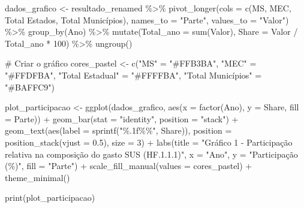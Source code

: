 \documentclass[
  letterpaper,
  DIV=11,
  numbers=noendperiod]{scrartcl}
\newenvironment{Shaded}{\begin{snugshade}}{\end{snugshade}}
\newcommand{\AttributeTok}[1]{\textcolor[rgb]{0.40,0.45,0.13}{#1}}
\newcommand{\CommentTok}[1]{\textcolor[rgb]{0.37,0.37,0.37}{#1}}
\newcommand{\DecValTok}[1]{\textcolor[rgb]{0.68,0.00,0.00}{#1}}
\newcommand{\FloatTok}[1]{\textcolor[rgb]{0.68,0.00,0.00}{#1}}
\newcommand{\FunctionTok}[1]{\textcolor[rgb]{0.28,0.35,0.67}{#1}}
\newcommand{\NormalTok}[1]{\textcolor[rgb]{0.00,0.23,0.31}{#1}}
\newcommand{\OtherTok}[1]{\textcolor[rgb]{0.00,0.23,0.31}{#1}}
\newcommand{\SpecialCharTok}[1]{\textcolor[rgb]{0.37,0.37,0.37}{#1}}
\newcommand{\StringTok}[1]{\textcolor[rgb]{0.13,0.47,0.30}{#1}}
\begin{document}
\begin{Shaded}
\begin{Highlighting}[]
\NormalTok{dados\_grafico }\OtherTok{\textless{}{-}}\NormalTok{ resultado\_renamed }\SpecialCharTok{\%\textgreater{}\%}
  \FunctionTok{pivot\_longer}\NormalTok{(}\AttributeTok{cols =} \FunctionTok{c}\NormalTok{(MS, MEC, }\StringTok{\textasciigrave{}}\AttributeTok{Total Estados}\StringTok{\textasciigrave{}}\NormalTok{, }\StringTok{\textasciigrave{}}\AttributeTok{Total Municípios}\StringTok{\textasciigrave{}}\NormalTok{), }
               \AttributeTok{names\_to =} \StringTok{"Parte"}\NormalTok{, }
               \AttributeTok{values\_to =} \StringTok{"Valor"}\NormalTok{) }\SpecialCharTok{\%\textgreater{}\%}
  \FunctionTok{group\_by}\NormalTok{(Ano) }\SpecialCharTok{\%\textgreater{}\%}
  \FunctionTok{mutate}\NormalTok{(}\AttributeTok{Total\_ano =} \FunctionTok{sum}\NormalTok{(Valor),}
         \AttributeTok{Share =}\NormalTok{ Valor }\SpecialCharTok{/}\NormalTok{ Total\_ano }\SpecialCharTok{*} \DecValTok{100}\NormalTok{) }\SpecialCharTok{\%\textgreater{}\%}
  \FunctionTok{ungroup}\NormalTok{()}

\CommentTok{\# Criar o gráfico}
\NormalTok{cores\_pastel }\OtherTok{\textless{}{-}} \FunctionTok{c}\NormalTok{(}\StringTok{"MS"} \OtherTok{=} \StringTok{"\#FFB3BA"}\NormalTok{, }\StringTok{"MEC"} \OtherTok{=} \StringTok{"\#FFDFBA"}\NormalTok{, }\StringTok{"Total Estadual"} \OtherTok{=} \StringTok{"\#FFFFBA"}\NormalTok{, }\StringTok{"Total Municípios"} \OtherTok{=} \StringTok{"\#BAFFC9"}\NormalTok{)}

\NormalTok{plot\_participacao }\OtherTok{\textless{}{-}} \FunctionTok{ggplot}\NormalTok{(dados\_grafico, }\FunctionTok{aes}\NormalTok{(}\AttributeTok{x =} \FunctionTok{factor}\NormalTok{(Ano), }\AttributeTok{y =}\NormalTok{ Share, }\AttributeTok{fill =}\NormalTok{ Parte)) }\SpecialCharTok{+}
  \FunctionTok{geom\_bar}\NormalTok{(}\AttributeTok{stat =} \StringTok{"identity"}\NormalTok{, }\AttributeTok{position =} \StringTok{"stack"}\NormalTok{) }\SpecialCharTok{+}
  \FunctionTok{geom\_text}\NormalTok{(}\FunctionTok{aes}\NormalTok{(}\AttributeTok{label =} \FunctionTok{sprintf}\NormalTok{(}\StringTok{"\%.1f\%\%"}\NormalTok{, Share)), }
            \AttributeTok{position =} \FunctionTok{position\_stack}\NormalTok{(}\AttributeTok{vjust =} \FloatTok{0.5}\NormalTok{), }\AttributeTok{size =} \DecValTok{3}\NormalTok{) }\SpecialCharTok{+}
  \FunctionTok{labs}\NormalTok{(}\AttributeTok{title =} \StringTok{"Gráfico 1 {-} Participação relativa na composição do gasto SUS (HF.1.1.1)"}\NormalTok{,}
       \AttributeTok{x =} \StringTok{"Ano"}\NormalTok{,}
       \AttributeTok{y =} \StringTok{"Participação (\%)"}\NormalTok{,}
       \AttributeTok{fill =} \StringTok{"Parte"}\NormalTok{) }\SpecialCharTok{+}
  \FunctionTok{scale\_fill\_manual}\NormalTok{(}\AttributeTok{values =}\NormalTok{ cores\_pastel) }\SpecialCharTok{+}
  \FunctionTok{theme\_minimal}\NormalTok{()}

\FunctionTok{print}\NormalTok{(plot\_participacao)}
\end{Highlighting}
\end{Shaded}
\end{document}
